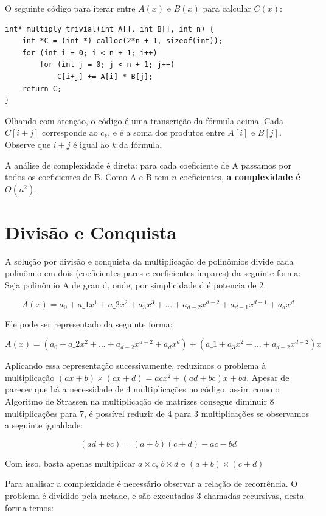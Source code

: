 \documentclass[
	12pt,				%
	oneside,			%
	a4paper,			%
	english,			%
	french,				%
	spanish,			%
	brazil,				%
	]{abntex2}
\begin{document}
O seguinte código para iterar entre $A(x)$ e $B(x)$ para calcular $C(x)$:

\begin{lstlisting}[mathescape=true, label=multiplicacao_direta]
int* multiply_trivial(int A[], int B[], int n) {
    int *C = (int *) calloc(2*n + 1, sizeof(int));
    for (int i = 0; i < n + 1; i++)
        for (int j = 0; j < n + 1; j++)
            C[i+j] += A[i] * B[j];
    return C;
}
\end{lstlisting}

Olhando com atenção, o código é uma transcrição da fórmula acima. Cada $C[i+j]$ corresponde ao $c_k$, e é a soma dos produtos entre $A[i]$ e $B[j]$. Observe que $i+j$ é igual ao $k$ da fórmula.

A análise de complexidade é direta: para cada coeficiente de A passamos por todos os coeficientes de B. Como A e B tem $n$ coeficientes, \textbf{a complexidade é $O(n^2)$}.

\section{Divisão e Conquista}

A solução por divisão e conquista da multiplicação de polinômios divide cada polinômio em dois (coeficientes pares e coeficientes ímpares) da seguinte forma:
Seja polinômio A de grau d, onde, por simplicidade d é potencia de 2, 

\[A(x) = a_0 + a\_1x^1 + a\_2x^2 + a_3x^3 + ... + a_{d-2}x^{d-2} + a_{d-1}x^{d-1} + a_{d}x^{d}\] 

Ele pode ser representado da seguinte forma:

\[A(x) = (a_0 + a\_2x^2 + ... + a_{d-2}x^{d-2} + a_{d}x^{d}) + (a\_1 + a_3x^2 + ... +  a_{d-2}x^{d-2})x\] 

Aplicando essa representação sucessivamente, reduzimos o problema à multiplicação $(ax+b)\times(cx+d) = acx^2 + (ad + bc)x + bd$. Apesar de parecer que há a necessidade de 4 multiplicações no código, assim como o Algoritmo de Strassen na multiplicação de matrizes consegue diminuir 8 multiplicações para 7, é possível reduzir de 4 para 3 multiplicações se observamos a seguinte igualdade:

\[(ad + bc) = (a + b)(c + d) - ac - bd \]

Com isso, basta apenas multiplicar $a\times{c}$, $b\times{d}$ e $(a+b)\times(c+d)$

Para analisar a complexidade é necessário observar a relação de recorrência. O problema é dividido pela metade, e são executadas 3 chamadas recursivas, desta forma temos:
\end{document}
